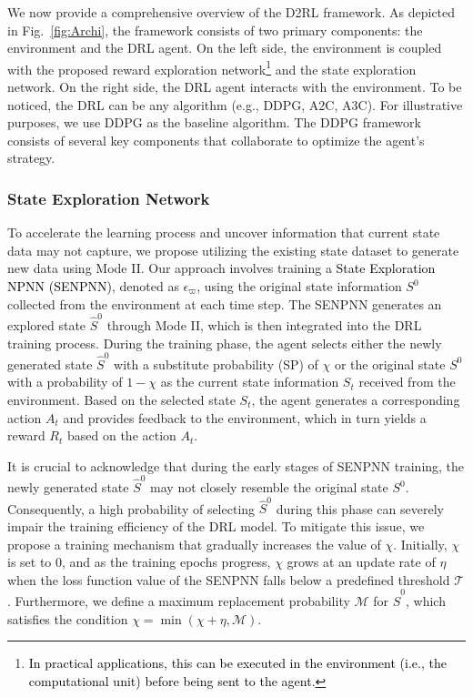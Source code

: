 \documentclass[comsoc,journal]{IEEEtran}
\begin{document}
We now provide a comprehensive overview of the D2RL framework. As depicted in Fig.~\ref{fig:Archi}, the framework consists of two primary components: the environment and the DRL agent. On the left side, the environment is coupled with the proposed reward exploration network\footnote{\textcolor{black}{In practical applications, this can be executed in the environment (i.e., the computational unit) before being sent to the agent.}} and the state exploration network. On the right side, the DRL agent interacts with the environment. To be noticed, the DRL can be any algorithm (e.g., DDPG, A2C, A3C). For illustrative purposes, we use DDPG as the baseline algorithm. The DDPG framework consists of several key components that collaborate to optimize the agent's strategy. 

\subsubsection{State Exploration Network}
To accelerate the learning process and uncover information that current state data may not capture, we propose utilizing the existing state dataset to generate new data using Mode II. Our approach involves training a \textcolor{black}{State Exploration NPNN (SENPNN)}, denoted as $\epsilon_{\varpi}$, using the original state information $S^0$ collected from the environment at each time step. The SENPNN generates an explored state $\hat{S}^{0}$ through Mode II, which is then integrated into the DRL training process.
During the training phase, the agent selects either the newly generated state $\hat{S}^{0}$ with a substitute probability (SP) of $\chi$ or the original state $S^0$ with a probability of $1-\chi$ as the current state information $S_t$ received from the environment. Based on the selected state $S_t$, the agent generates a corresponding action $A_t$ and provides feedback to the environment, which in turn yields a reward $R_t$ based on the action $A_t$.

It is crucial to acknowledge that during the early stages of SENPNN training, the newly generated state $\hat{S}^{0}$ may not closely resemble the original state $S^0$. Consequently, a high probability of selecting $\hat{S}^{0}$ during this phase can severely impair the training efficiency of the DRL model. To mitigate this issue, we propose a training mechanism that gradually increases the value of $\chi$. Initially, $\chi$ is set to 0, and as the training epochs progress, $\chi$ grows at an update rate of $\eta$ when the loss function value of the SENPNN falls below a predefined threshold $\mathcal{T}$. Furthermore, we define a maximum replacement probability $\mathcal{M}$ for $\hat{S}^{0}$, which satisfies the condition $\chi=\min(\chi+\eta,\mathcal{M})$.
\end{document}
